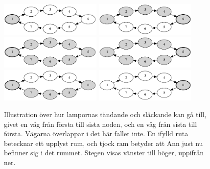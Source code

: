 \begin{figure}[!h]
\begin{center}
\includegraphics[width=5cm]{astep1.png}
\includegraphics[width=5cm]{astep2.png}
\includegraphics[width=5cm]{astep3.png}
\includegraphics[width=5cm]{astep4.png}
\includegraphics[width=5cm]{astep5.png}
\includegraphics[width=5cm]{astep6.png}
  \caption{Illustration över hur lampornas tändande och släckande kan gå till, givet en väg från första till sista noden, och en väg från sista till första. Vägarna överlappar i det här fallet inte. En ifylld ruta betecknar ett upplyst rum, och tjock ram betyder att Ann just nu befinner sig i det rummet. Stegen visas vänster till höger, uppifrån ner.}
\end{center}
\end{figure}


